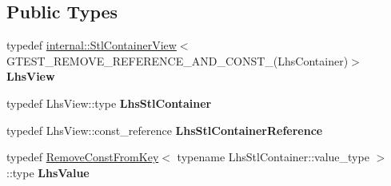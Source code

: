 \subsection*{Public Types}
\begin{DoxyCompactItemize}
\item 
typedef \hyperlink{classtesting_1_1internal_1_1StlContainerView}{internal\+::\+Stl\+Container\+View}$<$ G\+T\+E\+S\+T\+\_\+\+R\+E\+M\+O\+V\+E\+\_\+\+R\+E\+F\+E\+R\+E\+N\+C\+E\+\_\+\+A\+N\+D\+\_\+\+C\+O\+N\+S\+T\+\_\+(Lhs\+Container)$>$ {\bfseries Lhs\+View}\hypertarget{classtesting_1_1internal_1_1WhenSortedByMatcher_1_1Impl_a4c84fddfe1bf967a73e5dae1940db427}{}\label{classtesting_1_1internal_1_1WhenSortedByMatcher_1_1Impl_a4c84fddfe1bf967a73e5dae1940db427}

\item 
typedef Lhs\+View\+::type {\bfseries Lhs\+Stl\+Container}\hypertarget{classtesting_1_1internal_1_1WhenSortedByMatcher_1_1Impl_a2cb1a8d85ca2c376b6abdbcb00d84759}{}\label{classtesting_1_1internal_1_1WhenSortedByMatcher_1_1Impl_a2cb1a8d85ca2c376b6abdbcb00d84759}

\item 
typedef Lhs\+View\+::const\+\_\+reference {\bfseries Lhs\+Stl\+Container\+Reference}\hypertarget{classtesting_1_1internal_1_1WhenSortedByMatcher_1_1Impl_ab5e53a762bb213ccf84299b31c825b58}{}\label{classtesting_1_1internal_1_1WhenSortedByMatcher_1_1Impl_ab5e53a762bb213ccf84299b31c825b58}

\item 
typedef \hyperlink{structtesting_1_1internal_1_1RemoveConstFromKey}{Remove\+Const\+From\+Key}$<$ typename Lhs\+Stl\+Container\+::value\+\_\+type $>$\+::type {\bfseries Lhs\+Value}\hypertarget{classtesting_1_1internal_1_1WhenSortedByMatcher_1_1Impl_a93044f4ba53373fcfc424132b5e6c462}{}\label{classtesting_1_1internal_1_1WhenSortedByMatcher_1_1Impl_a93044f4ba53373fcfc424132b5e6c462}

\end{DoxyCompactItemize}
